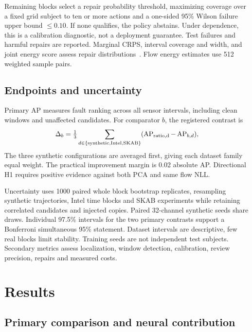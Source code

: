 \documentclass[conference]{IEEEtran}
\newcommand{\1}{\mathbf{1}}
\begin{document}
Remaining blocks select a repair probability threshold, maximizing coverage over a fixed grid subject to ten or more actions and a one-sided 95\% Wilson failure upper bound $\leq0.10$. If none qualifies, the policy abstains. Under dependence, this is a calibration diagnostic, not a deployment guarantee. Test failures and harmful repairs are reported. Marginal CRPS, interval coverage and width, and joint energy score assess repair distributions~\cite{crps}. Flow energy estimates use 512 weighted sample pairs.

\subsection{Endpoints and uncertainty}
Primary AP measures fault ranking across all sensor intervals, including clean windows and unaffected candidates. For comparator $b$, the registered contrast is
\[
 \Delta_b=\tfrac13\sum_{d\in\{\mathrm{synthetic,Intel,SKAB}\}}
       (\operatorname{AP}_{\rm ratio,d}-\operatorname{AP}_{b,d}),
\]
The three synthetic configurations are averaged first, giving each dataset family equal weight. The practical improvement margin is 0.02 absolute AP. Directional H1 requires positive evidence against both PCA and same flow NLL.

Uncertainty uses 1000 paired whole block bootstrap replicates, resampling synthetic trajectories, Intel time blocks and SKAB experiments while retaining correlated candidates and injected copies. Paired 32-channel synthetic seeds share draws. Individual 97.5\% intervals for the two primary contrasts support a Bonferroni simultaneous 95\% statement. Dataset intervals are descriptive, few real blocks limit stability. Training seeds are not independent test subjects. Secondary metrics assess localization, window detection, calibration, review precision, repairs and measured costs.






\section{Results}

\subsection{Primary comparison and neural contribution}
\end{document}
